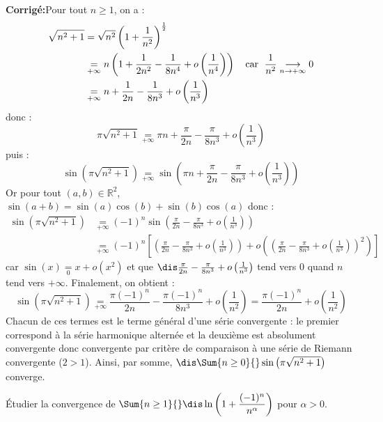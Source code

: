 \documentclass[a4paper,twoside,french,10pt]{VcCours}
\newcommand{\corr}{\textbf{Corrigé:}}
\begin{document}
\corr Pour tout $n \geq 1$, on a :
\begin{align*}
\sqrt {n^2 + 1} & = \sqrt{n^2} \left( 1 + \frac{1}{n^2} \right)^{\frac{1}{2}} \\
& \underset{+ \infty}{=} n \left(1 + \frac{1}{2n^2} - \frac{1}{8n^4} + o \left( \frac{1}{n^4} \right) \right) \quad \hbox{car } \; \frac{1}{n^2} \underset{n \rightarrow + \infty}{\longrightarrow} 0\\
& \underset{+ \infty}{=} n + \frac{1}{2n} - \frac{1}{8n^3} +  o \left( \frac{1}{n^3} \right)  
\end{align*}
donc :
$$ \pi \sqrt {n^2 + 1} \underset{+ \infty}{=} \pi n + \frac{\pi}{2n} - \frac{\pi}{8n^3} +  o \left( \frac{1}{n^3} \right)  $$
puis :
$$\sin \left({\pi \sqrt {n^2 + 1}} \right)  \underset{+ \infty}{=} \sin \left(  \pi n + \frac{\pi}{2n} - \frac{\pi}{8n^3} +  o \left( \frac{1}{n^3} \right) \right)$$
Or pour tout $(a,b) \in \mathbb{R}^2$, $\sin(a+b)= \sin(a)\cos(b)+\sin(b) \cos(a)$ donc :
\begin{align*}
 \sin \left({\pi \sqrt {n^2 + 1}} \right)& \underset{+ \infty}{=} (-1)^n \sin \left(\frac{\pi}{2n} - \frac{\pi}{8n^3} +  o \left( \frac{1}{n^3} \right) \right) \\
 & \underset{+ \infty}{=} (-1)^n \left[\left(\frac{\pi}{2n} - \frac{\pi}{8n^3} +  o \left( \frac{1}{n^3} \right) \right) + o \left( \left(\frac{\pi}{2n} - \frac{\pi}{8n^3} +  o \left( \frac{1}{n^3} \right) \right)^2 \right) \right] 
 \end{align*}
car $\sin(x) \underset{0}{=} x + o(x^2)$ et que $\dis \frac{\pi}{2n} - \frac{\pi}{8n^3} +  o \left( \frac{1}{n^3} \right)$ tend vers $0$ quand $n$ tend vers $+ \infty$. Finalement, on obtient :
$$ \sin \left({\pi \sqrt {n^2 + 1}} \right) \underset{+ \infty}{=} \frac{\pi (-1)^n}{2n} - \frac{\pi (-1)^n}{8n^3} +  o \left( \frac{1}{n^2} \right) = \frac{\pi (-1)^n}{2n} +  o \left( \frac{1}{n^2} \right)$$
Chacun de ces termes est le terme général d'une série convergente : le premier correspond à la série harmonique alternée et la deuxième est absolument convergente donc convergente par critère de comparaison à une série de Riemann convergente ($2>1$). Ainsi, par somme, $\dis \Sum{n \geq 0}{} \sin \left({\pi \sqrt {n^2 + 1}} \right)$ converge.

\medskip



\begin{Exercice}{} Étudier la convergence de $\Sum{n \geq 1}{} \dis \ln \left( 1 + \dfrac{(-1)^n}{n^{\alpha}} \right)$ pour $\alpha>0$.
\end{Exercice} 
\end{document}

